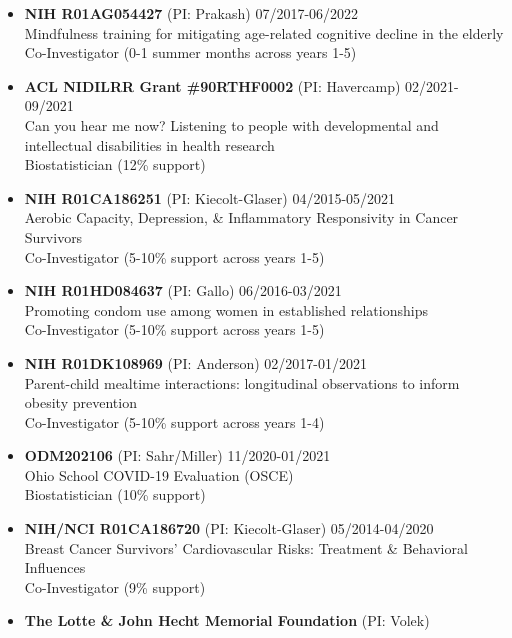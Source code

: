 \documentclass[
  english,
  letterpaper,
  DIV=11,
  numbers=noendperiod]{scrartcl}
\begin{document}
\begin{itemize}
  \textbf{NIH R01AG057032} (PI: Kiecolt-Glaser) {10/2017-05/2022}\\
  Marital quality and longevity: Biobehavioral pathways\\
  Co-Investigator (5-10\% support across years 1-5)
\item
  \textbf{NIH R01AG054427} (PI: Prakash) {07/2017-06/2022}\\
  Mindfulness training for mitigating age-related cognitive decline in
  the elderly\\
  Co-Investigator (0-1 summer months across years 1-5)
\item
  \textbf{ACL NIDILRR Grant \#90RTHF0002} (PI: Havercamp)
  {02/2021-09/2021}\\
  Can you hear me now? Listening to people with developmental and
  intellectual disabilities in health research\\
  Biostatistician (12\% support)
\item
  \textbf{NIH R01CA186251} (PI: Kiecolt-Glaser) {04/2015-05/2021}\\
  Aerobic Capacity, Depression, \& Inflammatory Responsivity in Cancer
  Survivors\\
  Co-Investigator (5-10\% support across years 1-5)
\item
  \textbf{NIH R01HD084637} (PI: Gallo) {06/2016-03/2021}\\
  Promoting condom use among women in established relationships\\
  Co-Investigator (5-10\% support across years 1-5)
\item
  \textbf{NIH R01DK108969} (PI: Anderson) {02/2017-01/2021}\\
  Parent-child mealtime interactions: longitudinal observations to
  inform obesity prevention\\
  Co-Investigator (5-10\% support across years 1-4)
\item
  \textbf{ODM202106} (PI: Sahr/Miller) {11/2020-01/2021}\\
  Ohio School COVID-19 Evaluation (OSCE)\\
  Biostatistician (10\% support)
\item
  \textbf{NIH/NCI R01CA186720} (PI: Kiecolt-Glaser) {05/2014-04/2020}\\
  Breast Cancer Survivors' Cardiovascular Risks: Treatment \& Behavioral
  Influences\\
  Co-Investigator (9\% support)
\item
  \textbf{The Lotte \& John Hecht Memorial Foundation} (PI: Volek)

\end{itemize}
\end{document}
